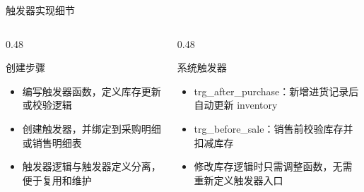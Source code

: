 \documentclass{beamer}
\newcommand{\smallitems}{\setlength{\itemsep}{0.18em}\footnotesize}
\newcommand{\code}[1]{{\ttfamily\small #1}}
\begin{document}
\begin{frame}{触发器实现细节}
  \begin{columns}[T,onlytextwidth]
    \begin{column}{0.48\textwidth}
      \begin{block}{创建步骤}
        \smallitems
        \begin{itemize}
          \item 编写触发器函数，定义库存更新或校验逻辑
          \item 创建触发器，并绑定到采购明细或销售明细表
          \item 触发器逻辑与触发器定义分离，便于复用和维护
        \end{itemize}
      \end{block}
    \end{column}
    \begin{column}{0.48\textwidth}
      \begin{block}{系统触发器}
        \smallitems
        \begin{itemize}
          \item \code{trg\_after\_purchase}：新增进货记录后自动更新 inventory
          \item \code{trg\_before\_sale}：销售前校验库存并扣减库存
          \item 修改库存逻辑时只需调整函数，无需重新定义触发器入口
        \end{itemize}
      \end{block}
    \end{column}
  \end{columns}
\end{frame}
\end{document}
